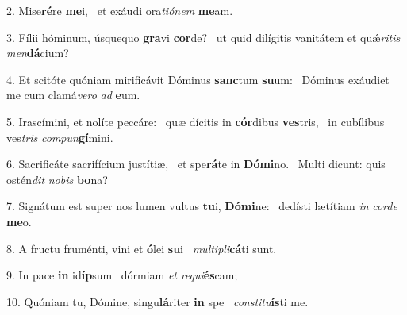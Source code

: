 2. Mise\textbf{ré}re \textbf{me}i, \ast\  et exáudi ora\textit{ti}\textit{ó}\textit{nem} \textbf{me}am.\

3. Fílii hóminum, úsquequo \textbf{gra}vi \textbf{cor}de? \ast\  ut quid dilígitis vanitátem et quǽ\textit{ri}\textit{tis} \textit{men}\textbf{dá}cium?\

4. Et scitóte quóniam mirificávit Dóminus \textbf{sanc}tum \textbf{su}um: \ast\  Dóminus exáudiet me cum clamá\textit{ve}\textit{ro} \textit{ad} \textbf{e}um.\

5. Irascímini, et nolíte peccáre: \dag\  quæ dícitis in \textbf{cór}dibus \textbf{ves}tris, \ast\  in cubílibus ves\textit{tris} \textit{com}\textit{pun}\textbf{gí}mini.\

6. Sacrificáte sacrifícium justítiæ, \dag\  et spe\textbf{rá}te in \textbf{Dó}\textbf{mi}no. \ast\  Multi dicunt: quis ostén\textit{dit} \textit{no}\textit{bis} \textbf{bo}na?\

7. Signátum est super nos lumen vultus \textbf{tu}i, \textbf{Dó}\textbf{mi}ne: \ast\  dedísti lætítiam \textit{in} \textit{cor}\textit{de} \textbf{me}o.\

8. A fructu fruménti, vini et \textbf{ó}lei \textbf{su}i \ast\  \textit{mul}\textit{ti}\textit{pli}\textbf{cá}ti sunt.\

9. In pace \textbf{in} id\textbf{íp}sum \ast\  dórmiam \textit{et} \textit{re}\textit{qui}\textbf{és}cam;\

10. Quóniam tu, Dómine, singu\textbf{lá}riter \textbf{in} spe \ast\  \textit{con}\textit{sti}\textit{tu}\textbf{ís}ti me.\

